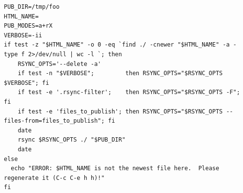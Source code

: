 \documentclass[11pt]{article}
\begin{document}
\begin{verbatim}
PUB_DIR=/tmp/foo
HTML_NAME=
PUB_MODES=a+rX
VERBOSE=-ii
if test -z "$HTML_NAME" -o 0 -eq `find ./ -cnewer "$HTML_NAME" -a -type f 2>/dev/null | wc -l `; then
    RSYNC_OPTS='--delete -a'
    if test -n "$VERBOSE";         then RSYNC_OPTS="$RSYNC_OPTS $VERBOSE"; fi
    if test -e '.rsync-filter';    then RSYNC_OPTS="$RSYNC_OPTS -F"; fi
    if test -e 'files_to_publish'; then RSYNC_OPTS="$RSYNC_OPTS --files-from=files_to_publish"; fi
    date
    rsync $RSYNC_OPTS ./ "$PUB_DIR"
    date
else
  echo "ERROR: $HTML_NAME is not the newest file here.  Please regenerate it (C-c C-e h h)!"
fi
\end{verbatim}
\end{document}
